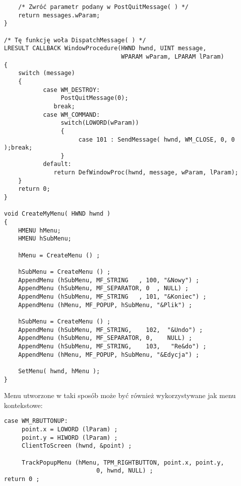 \begin{scriptsize}
\begin{verbatim}
    /* Zwróć parametr podany w PostQuitMessage( ) */
    return messages.wParam;
}

/* Tę funkcję woła DispatchMessage( ) */
LRESULT CALLBACK WindowProcedure(HWND hwnd, UINT message, 
                                 WPARAM wParam, LPARAM lParam)
{
    switch (message)                  
    {
           case WM_DESTROY:
                PostQuitMessage(0);        
              break;
           case WM_COMMAND:
                switch(LOWORD(wParam))
                {
                     case 101 : SendMessage( hwnd, WM_CLOSE, 0, 0 );break;
                }   
           default:                   
              return DefWindowProc(hwnd, message, wParam, lParam);
    }
    return 0;
}

void CreateMyMenu( HWND hwnd )
{
	HMENU hMenu;
	HMENU hSubMenu;

	hMenu = CreateMenu () ;

	hSubMenu = CreateMenu () ;
	AppendMenu (hSubMenu, MF_STRING   , 100, "&Nowy") ;
	AppendMenu (hSubMenu, MF_SEPARATOR, 0  , NULL) ;
	AppendMenu (hSubMenu, MF_STRING   , 101, "&Koniec") ;
	AppendMenu (hMenu, MF_POPUP, hSubMenu, "&Plik") ;

	hSubMenu = CreateMenu () ;
	AppendMenu (hSubMenu, MF_STRING,    102,  "&Undo") ;
	AppendMenu (hSubMenu, MF_SEPARATOR, 0,    NULL) ;
	AppendMenu (hSubMenu, MF_STRING,    103,   "Re&do") ;
	AppendMenu (hMenu, MF_POPUP, hSubMenu, "&Edycja") ;

	SetMenu( hwnd, hMenu );
}
\end{verbatim}
\end{scriptsize}

Menu utworzone w taki sposób może być również wykorzystywane jak menu kontekstowe:

\begin{scriptsize}
\begin{verbatim}
case WM_RBUTTONUP:
     point.x = LOWORD (lParam) ;
     point.y = HIWORD (lParam) ;
     ClientToScreen (hwnd, &point) ;
          
     TrackPopupMenu (hMenu, TPM_RIGHTBUTTON, point.x, point.y, 
                          0, hwnd, NULL) ;
return 0 ;
\end{verbatim}
\end{scriptsize}
